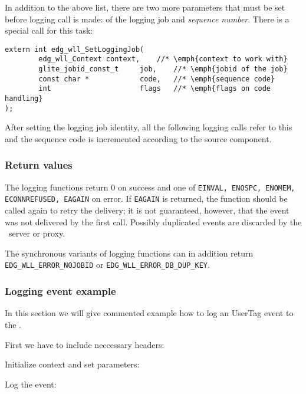 %
In addition to the above list, there are two more parameters that must
be set before logging call is made: \jobid of the logging job and
\emph{sequence number}. There is a special call for this task:
\begin{lstlisting}
extern int edg_wll_SetLoggingJob(
        edg_wll_Context context,	//* \emph{context to work with}
        glite_jobid_const_t     job,	//* \emph{jobid of the job}
        const char *            code,	//* \emph{sequence code}
        int                     flags	//* \emph{flags on code handling}
);
\end{lstlisting}
After setting the logging job identity, all the following logging
calls refer to this \jobid and the sequence code is incremented
according to the source component. 

\subsubsection{Return values}
The logging functions return 0 on success and one of \texttt{EINVAL,
ENOSPC, ENOMEM, ECONNREFUSED, EAGAIN} on error. If \texttt{EAGAIN} is
returned, the function should be called again to retry the delivery;
it is not guaranteed, however, that the event was not delivered by the
first call. Possibly duplicated events are discarded by the \LB\
server or proxy.

The synchronous variants of logging functions can in addition return
\verb'EDG_WLL_ERROR_NOJOBID' or \verb'EDG_WLL_ERROR_DB_DUP_KEY'.

\subsubsection{Logging event example}
In this section we will give commented example how to log an UserTag event to
the \LB.

First we have to include neccessary headers:


Initialize context and set parameters:




Log the event:


